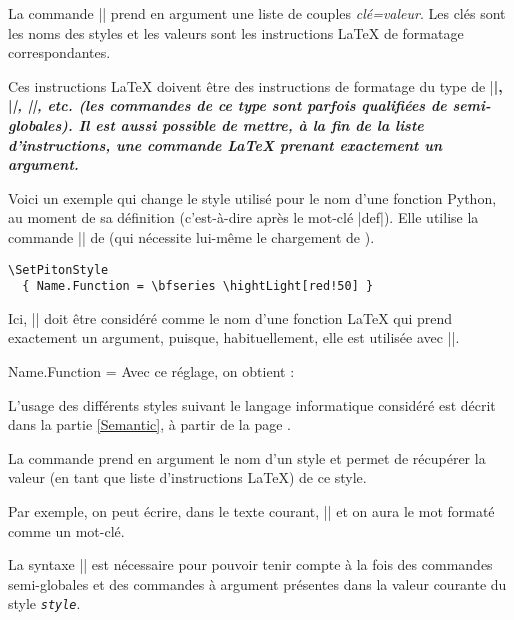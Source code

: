 \documentclass[dvipsnames,svgnames]{article}
\begin{document}
\bigskip
{}
La commande |\SetPitonStyle| prend en argument une liste de couples \textsl{clé=valeur}. Les clés sont les noms des
styles et les valeurs sont les instructions LaTeX de formatage correspondantes.

\bigskip
Ces instructions LaTeX doivent être des instructions de formatage du type de |\bfseries|, |\slshape|,
|\color{...}|, etc. (les commandes de ce type sont parfois qualifiées de \emph{semi-globales}). Il est aussi
possible de mettre, \emph{à la fin de la liste d'instructions}, une commande LaTeX prenant exactement un argument.

\bigskip
Voici un exemple qui change le style utilisé pour le nom d'une fonction Python, au moment de sa définition
(c'est-à-dire après le mot-clé |def|). Elle utilise la commande |\highLight| de  (qui nécessite
lui-même le chargement de ).

\begin{Verbatim}
\SetPitonStyle
  { Name.Function = \bfseries \hightLight[red!50] }
\end{Verbatim}

Ici, |\highLight[red!50]| doit être considéré comme le nom d'une fonction LaTeX qui prend exactement un argument,
puisque, habituellement, elle est utilisée avec ||.

\medskip
\begingroup
\SetPitonStyle 
  { Name.Function = \bfseries \highLight[red!50] }
Avec ce réglage, on obtient : 
\endgroup


\bigskip
L'usage des différents styles suivant le langage informatique considéré est décrit dans la partie \ref{Semantic}, à
partir de la page \pageref{Semantic}. 



\bigskip
{}
La commande  prend en argument le nom d'un style et permet de récupérer la valeur (en
tant que liste d'instructions LaTeX) de ce style.

\smallskip
Par exemple, on peut écrire, dans le texte courant, |{}| et on aura 
le mot {} formaté comme un mot-clé.

\smallskip
La syntaxe |{}| est nécessaire pour pouvoir tenir compte à la fois des commandes
semi-globales et des commandes à argument présentes dans la valeur courante du style \texttt{\textsl{style}}.
\end{document}
